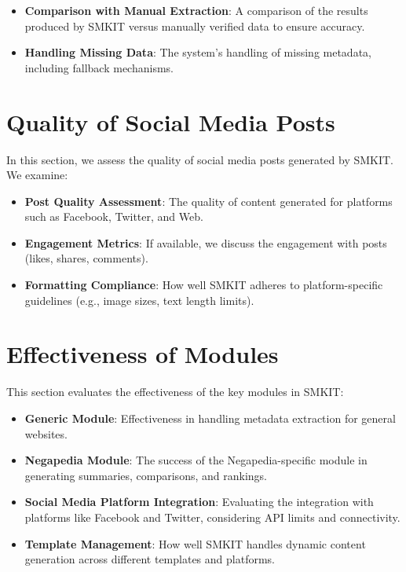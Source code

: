 \begin{itemize}
    \item \textbf{Comparison with Manual Extraction}: A comparison of the results produced by SMKIT versus manually verified data to ensure accuracy.
    \item \textbf{Handling Missing Data}: The system’s handling of missing metadata, including fallback mechanisms.
\end{itemize}


\section{Quality of Social Media Posts}
\label{sec:social_media_posts_quality}
In this section, we assess the quality of social media posts generated by SMKIT. We examine:

\begin{itemize}
    \item \textbf{Post Quality Assessment}: The quality of content generated for platforms such as Facebook, Twitter, and Web.
    \item \textbf{Engagement Metrics}: If available, we discuss the engagement with posts (likes, shares, comments).
    \item \textbf{Formatting Compliance}: How well SMKIT adheres to platform-specific guidelines (e.g., image sizes, text length limits).
\end{itemize}


\section{Effectiveness of Modules}
\label{sec:modules_effectiveness}
This section evaluates the effectiveness of the key modules in SMKIT:

\begin{itemize}
    \item \textbf{Generic Module}: Effectiveness in handling metadata extraction for general websites.
    \item \textbf{Negapedia Module}: The success of the Negapedia-specific module in generating summaries, comparisons, and rankings.
    \item \textbf{Social Media Platform Integration}: Evaluating the integration with platforms like Facebook and Twitter, considering API limits and connectivity.
    \item \textbf{Template Management}: How well SMKIT handles dynamic content generation across different templates and platforms.
\end{itemize}


